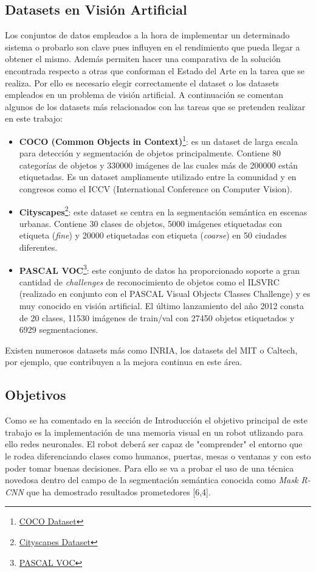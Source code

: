 \documentclass{bmvc2k}
\begin{document}
\subsection{Datasets en Visión Artificial}
Los conjuntos de datos empleados a la hora de implementar un determinado sistema o probarlo son clave pues influyen en el rendimiento que pueda llegar a obtener el mismo. Además permiten hacer una comparativa de la solución encontrada respecto a otras que conforman el Estado del Arte en la tarea que se realiza. Por ello es necesario elegir correctamente el dataset o los datasets empleados en un problema de visión artificial. A continuación se comentan algunos de los datasets más relacionados con las tareas que se pretenden realizar en este trabajo:
\begin{itemize}
\item \textbf{COCO (Common Objects in Context)}\footnote {\href{http://cocodataset.org/#home}{COCO Dataset}}: es un dataset de larga escala para detección y segmentación de objetos principalmente. Contiene 80 categorías de objetos y 330000 imágenes de las cuales más de 200000 están etiquetadas. Es un dataset ampliamente utilizado entre la comunidad y en congresos como el ICCV (International Conference on Computer Vision).
\item \textbf{Cityscapes}\footnote {\href{https://www.cityscapes-dataset.com/}{Cityscapes Dataset}}: este dataset se centra en la segmentación semántica en escenas urbanas. Contiene 30 clases de objetos, 5000 imágenes etiquetadas con etiqueta  (\textit{fine}) y 20000 etiquetadas con etiqueta  (\textit{coarse}) en 50 ciudades diferentes.
\item \textbf{PASCAL VOC}\footnote {\href{http://host.robots.ox.ac.uk/pascal/VOC/}{PASCAL VOC}}: este conjunto de datos ha proporcionado soporte a gran cantidad de \textit{challenges} de reconocimiento de objetos como el ILSVRC (realizado en conjunto con el PASCAL Visual Objects Classes Challenge) y es muy conocido en visión artificial. El último lanzamiento del año 2012 consta de 20 clases, 11530 imágenes de train/val con 27450 objetos etiquetados y 6929 segmentaciones.
\end{itemize}
Existen numerosos datasets más como INRIA, los datasets del MIT o Caltech, por ejemplo, que contribuyen a la mejora continua en este área.

\subsection{Objetivos}
Como se ha comentado en la sección de Introducción el objetivo principal de este trabajo es la implementación de una memoria visual en un robot utlizando para ello redes neuronales. El robot deberá ser capaz de "comprender" el entorno que le rodea diferenciando clases como humanos, puertas, mesas o ventanas y con esto poder tomar buenas decisiones. Para ello se va a probar el uso de una técnica novedosa dentro del campo de la segmentación semántica conocida como \textit{Mask R-CNN} que ha demostrado resultados prometedores [6,4].
\end{document}
